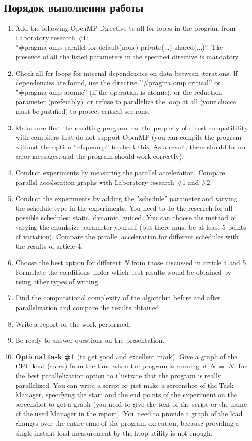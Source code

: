 { %
	\subsection{Порядок выполнения работы}
	\begin{enumerate}
		\item Add the following OpenMP Directive to all for-loops in the program from Laboratory research \#1: \\	
''\#pragma omp parallel for default(none) private(...) shared(...)''. The presence of all the listed parameters in the specified directive is mandatory.
		\item Check all for-loops for internal dependencies on data between iterations. If dependencies are found, use the directive ''\#pragma omp critical'' or ''\#pragma omp atomic'' (if the operation is atomic), or the reduction parameter (preferably), or refuse to parallelize the loop at all (your choice must be justified) to protect critical sections.
		\item Make sure that the resulting program has the property of direct compatibility with compilers that do not support OpenMP (you can compile the program without the option ''–fopenmp'' to check this. As a result, there should be no error messages, and the program should work correctly).
		\item Conduct experiments by measuring the parallel acceleration. Compare parallel acceleration graphs with Laboratory research \#1 and \#2.
		\item Conduct the experiments by adding the ''schedule'' parameter and varying the schedule type in the experiments. You need to do the research for all possible schedules: static, dynamic, guided. You can choose the method of varying the chunk\textunderscore size parameter yourself (but there must be at least 5 points of variation). Compare the parallel acceleration for different schedules with the results of article 4.
		\item Choose the best option for different $N$ from those discussed in article 4 and 5. Formulate the conditions under which best results would be obtained by using other types of writing.
		\item Find the computational complexity of the algorithm before and after parallelization and compare the results obtained.
		\item Write a report on the work performed.
		\item Be ready to answer questions on the presentation.
		\item\textbf{Optional task \#1} (to get good and excellent mark). Give a graph of the CPU load (cores) from the time when the program is running at $N\;=\;N_1$ for the best parallelization option to illustrate that the program is really parallelized. You can write a script or just make a screenshot of the Task Manager, specifying the start and the end points of the experiment on the screenshot to get a graph (you need to give the text of the script or the name of the used Manager in the report). You need to provide a graph of the load changes over the entire time of the program execution, because providing a single instant load measurement by the htop utility is not enough.

\end{enumerate}}
